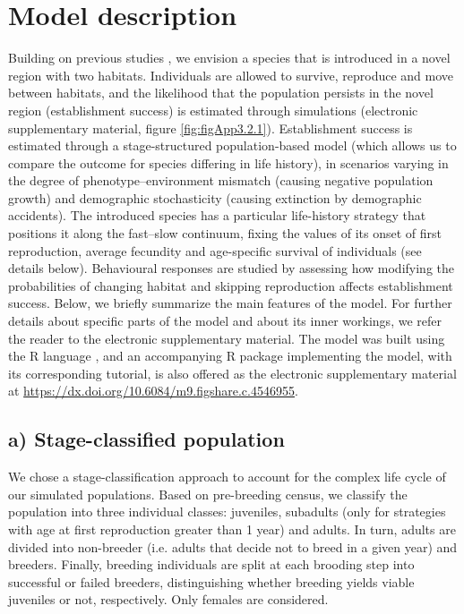 \section{Model description}

Building on previous studies \citep{Cressman2013, kawecki1995demography}, we envision a species
that is introduced in a novel region with two habitats.
Individuals are allowed to survive, reproduce and move
between habitats, and the likelihood that the population persists
in the novel region (establishment success) is estimated
through simulations (electronic supplementary material,
figure \ref{fig:figApp3.2.1}). Establishment success is estimated through a
stage-structured population-based model (which allows us
to compare the outcome for species differing in life history),
in scenarios varying in the degree of phenotype–environment
mismatch (causing negative population growth) and
demographic stochasticity (causing extinction by demographic
accidents). The introduced species has a particular
life-history strategy that positions it along the fast–slow continuum,
fixing the values of its onset of first reproduction,
average fecundity and age-specific survival of individuals
(see details below). Behavioural responses are studied by
assessing how modifying the probabilities of changing habitat
and skipping reproduction affects establishment success.
Below, we briefly summarize the main features of the
model. For further details about specific parts of the model
and about its inner workings, we refer the reader to the electronic
supplementary material. The model was built using
the R language \citep{RCoreTeam}, and an accompanying R package implementing
the model, with its corresponding tutorial, is also
offered as the electronic supplementary material at
\url{https://dx.doi.org/10.6084/m9.figshare.c.4546955}.


\subsection*{a) Stage-classified population}

We chose a stage-classification approach to account for the
complex life cycle of our simulated populations. Based on
pre-breeding census, we classify the population into three individual
classes: juveniles, subadults (only for strategies with age
at first reproduction greater than 1 year) and adults. In turn,
adults are divided into non-breeder (i.e. adults that decide
not to breed in a given year) and breeders. Finally, breeding
individuals are split at each brooding step into successful or
failed breeders, distinguishing whether breeding yields viable
juveniles or not, respectively. Only females are considered.


